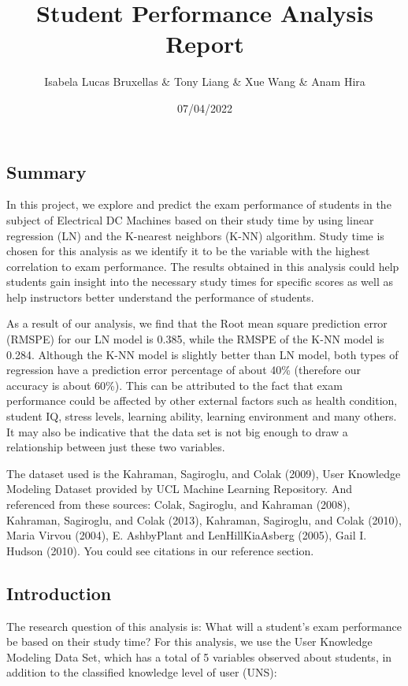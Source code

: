 \documentclass[
]{article}
\title{Student Performance Analysis Report}
\author{Isabela Lucas Bruxellas \& Tony Liang \& Xue Wang \& Anam Hira}
\date{07/04/2022}
\begin{document}
\maketitle

{
\setcounter{tocdepth}{2}
\tableofcontents
}
\hypertarget{summary}{%
\subsection{Summary}\label{summary}}

In this project, we explore and predict the exam performance of students in the subject of Electrical DC Machines based on their study time by using linear regression (LN) and the K-nearest neighbors (K-NN) algorithm. Study time is chosen for this analysis as we identify it to be the variable with the highest correlation to exam performance. The results obtained in this analysis could help students gain insight into the necessary study times for specific scores as well as help instructors better understand the performance of students.

As a result of our analysis, we find that the Root mean square prediction error (RMSPE) for our LN model is 0.385, while the RMSPE of the K-NN model is 0.284. Although the K-NN model is slightly better than LN model, both types of regression have a prediction error percentage of about 40\% (therefore our accuracy is about 60\%). This can be attributed to the fact that exam performance could be affected by other external factors such as health condition, student IQ, stress levels, learning ability, learning environment and many others. It may also be indicative that the data set is not big enough to draw a relationship between just these two variables.

The dataset used is the Kahraman, Sagiroglu, and Colak (2009), User Knowledge Modeling Dataset provided by UCL Machine Learning Repository. And referenced from these sources: Colak, Sagiroglu, and Kahraman (2008), Kahraman, Sagiroglu, and Colak (2013), Kahraman, Sagiroglu, and Colak (2010), Maria Virvou (2004), E. AshbyPlant and LenHillKiaAsberg (2005), Gail I. Hudson (2010). You could see citations in our reference section.

\hypertarget{introduction}{%
\subsection{Introduction}\label{introduction}}

The research question of this analysis is: What will a student's exam performance be based on their study time?
For this analysis, we use the User Knowledge Modeling Data Set, which has a total of 5 variables observed about students, in addition to the classified knowledge level of user (UNS):
\end{document}
